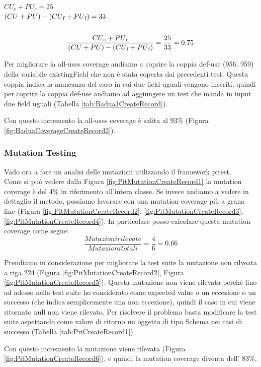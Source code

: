 \documentclass[12pt, a4paper]{article}
\begin{document}
\(CU_c + PU_c = 25\) \\
\( (CU + PU) - (CU\textsubscript{f} + PU\textsubscript{f}) = 33\) \\ \\
\[\frac{{CU\textsubscript{c} + PU\textsubscript{c}}}{{(CU + PU) - (CU\textsubscript{f} + PU\textsubscript{f})}} = \frac{{25}}{{33}} = 0.75\]

Per migliorare la all-uses coverage andiamo a coprire la coppia def-use (956, 959) della variabile existingField che non 
è stata coperta dai precedenti test. Questa coppia indica la mancanza del caso in cui due field uguali vengono inseriti, 
quindi per coprire la coppia def-use andiamo ad aggiungere un test che manda in input due field uguali 
(Tabella \ref{tab:Badua1CreateRecord}).

Con questo incremento la all-uses coverage è salita al 93\% (Figura \ref{fig:BaduaCoverageCreateRecord2}).
\subsubsection{Mutation Testing}

Vado ora a fare un analisi delle mutazioni utilizzando il framework pitest. \\
Come si può vedere dalla Figura \ref{fig:PitMutationCreateRecord1} la mutation coverage è del 4\% in riferimento 
all'intera classe. Se invece andiamo a vedere in dettaglio il metodo, possiamo lavorare con una mutation coverage 
più a grana fine (Figura \ref{fig:PitMutationCreateRecord2}, \ref{fig:PitMutationCreateRecord3}, \ref{fig:PitMutationCreateRecord4}).
In particolare posso calcolare questa mutation coverage come segue:
\[\frac{{Mutazioni rilevate}}{{Mutazioni totali}} = \frac{{4}}{{6}} = 0.66\]

Prendiamo in considerazione per migliorare la test suite la mutazione non rilveata a riga 224 
(Figura \ref{fig:PitMutationCreateRecord2}, Figura \ref{fig:PitMutationCreateRecord5}).
Questa mutazione non viene rilevata perchè fino ad adesso nella test suite ho considerato come expected value o un eccezione
o un successo (che indica semplicemente una non eccezione), quindi il caso in cui viene ritornato null non viene rilevato.
Per risolvere il problema basta modificare la test suite aspettando come valore di ritorno un oggetto di tipo Schema nei casi 
di successo (Tabella \ref{tab:PitCreateRecord1})

Con questo incremento la mutazione viene rilevata (Figura \ref{fig:PitMutationCreateRecord6}), e quindi 
la mutation coverage diventa dell' 83\%. 
\end{document}
